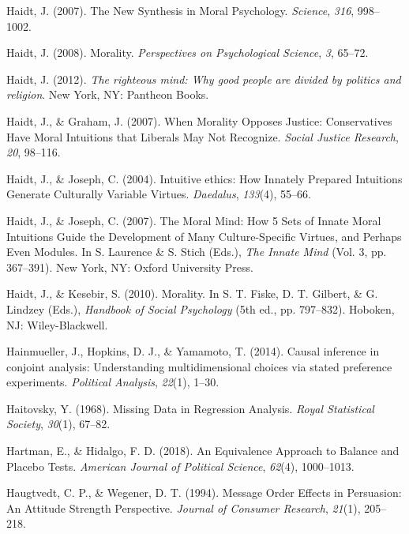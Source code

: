 \documentclass[12pt,econ]{sources/authesis}
\begin{document}
\leavevmode\hypertarget{ref-haidt_2007_synthesis}{}%
Haidt, J. (2007). The New Synthesis in Moral Psychology. \emph{Science}, \emph{316}, 998--1002.

\leavevmode\hypertarget{ref-haidt_2008_morality}{}%
Haidt, J. (2008). Morality. \emph{Perspectives on Psychological Science}, \emph{3}, 65--72.

\leavevmode\hypertarget{ref-haidt_2012_righteous}{}%
Haidt, J. (2012). \emph{The righteous mind: Why good people are divided by politics and religion}. New York, NY: Pantheon Books.

\leavevmode\hypertarget{ref-haidt_2007_when}{}%
Haidt, J., \& Graham, J. (2007). When Morality Opposes Justice: Conservatives Have Moral Intuitions that Liberals May Not Recognize. \emph{Social Justice Research}, \emph{20}, 98--116.

\leavevmode\hypertarget{ref-haidt_2004_intuitive}{}%
Haidt, J., \& Joseph, C. (2004). Intuitive ethics: How Innately Prepared Intuitions Generate Culturally Variable Virtues. \emph{Daedalus}, \emph{133}(4), 55--66.

\leavevmode\hypertarget{ref-haidt_2007_moral}{}%
Haidt, J., \& Joseph, C. (2007). The Moral Mind: How 5 Sets of Innate Moral Intuitions Guide the Development of Many Culture-Specific Virtues, and Perhaps Even Modules. In S. Laurence \& S. Stich (Eds.), \emph{The Innate Mind} (Vol. 3, pp. 367--391). New York, NY: Oxford University Press.

\leavevmode\hypertarget{ref-haidt_2010_morality}{}%
Haidt, J., \& Kesebir, S. (2010). Morality. In S. T. Fiske, D. T. Gilbert, \& G. Lindzey (Eds.), \emph{Handbook of Social Psychology} (5th ed., pp. 797--832). Hoboken, NJ: Wiley-Blackwell.

\leavevmode\hypertarget{ref-hainmueller_2014_causal}{}%
Hainmueller, J., Hopkins, D. J., \& Yamamoto, T. (2014). Causal inference in conjoint analysis: Understanding multidimensional choices via stated preference experiments. \emph{Political Analysis}, \emph{22}(1), 1--30.

\leavevmode\hypertarget{ref-haitovsky_1968_missing}{}%
Haitovsky, Y. (1968). Missing Data in Regression Analysis. \emph{Royal Statistical Society}, \emph{30}(1), 67--82.

\leavevmode\hypertarget{ref-hartman_2018_equivalence}{}%
Hartman, E., \& Hidalgo, F. D. (2018). An Equivalence Approach to Balance and Placebo Tests. \emph{American Journal of Political Science}, \emph{62}(4), 1000--1013.

\leavevmode\hypertarget{ref-haugtvedt_1994_message}{}%
Haugtvedt, C. P., \& Wegener, D. T. (1994). Message Order Effects in Persuasion: An Attitude Strength Perspective. \emph{Journal of Consumer Research}, \emph{21}(1), 205--218.
\end{document}
